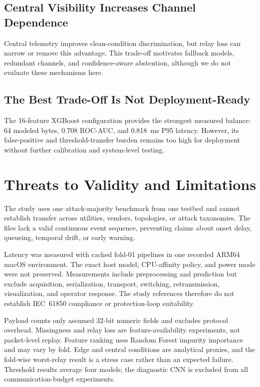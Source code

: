 \documentclass[conference]{IEEEtran}
\begin{document}
\subsection{Central Visibility Increases Channel Dependence}

Central telemetry improves clean-condition discrimination, but relay loss can
narrow or remove this advantage. This trade-off motivates fallback models,
redundant channels, and confidence-aware abstention, although we do not
evaluate these mechanisms here.

\subsection{The Best Trade-Off Is Not Deployment-Ready}

The 16-feature XGBoost configuration provides the strongest measured balance:
64 modeled bytes, 0.708 ROC-AUC, and 0.818~ms P95 latency. However, its
false-positive and threshold-transfer burden remains too high for deployment
without further calibration and system-level testing.

\FloatBarrier
\section{Threats to Validity and Limitations}

The study uses one attack-majority benchmark from one testbed and cannot
establish transfer across utilities, vendors, topologies, or attack taxonomies.
The files lack a valid continuous event sequence, preventing claims about
onset delay, queueing, temporal drift, or early warning.

Latency was measured with cached fold-01 pipelines in one recorded ARM64
macOS environment. The exact host model, CPU-affinity policy, and power mode
were not preserved. Measurements include preprocessing and prediction but
exclude acquisition, serialization, transport, switching, retransmission,
visualization, and operator response. The study references therefore do not
establish IEC~61850 compliance or protection-loop suitability.

Payload counts only assumed 32-bit numeric fields and excludes protocol
overhead. Missingness and relay loss are feature-availability experiments, not
packet-level replay. Feature ranking uses Random Forest impurity importance
and may vary by fold. Edge and central conditions are analytical proxies, and
the fold-wise worst-relay result is a stress case rather than an expected
failure. Threshold results average four models; the diagnostic CNN is excluded
from all communication-budget experiments.
\end{document}
